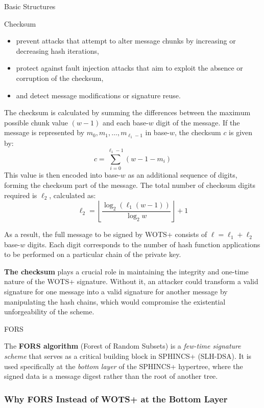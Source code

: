 \documentclass[version=preprint]{iacrcc}
\begin{document}
\begin{section}{Basic Structures}{\label{sec1}}
\begin{subsection}{Checksum}{\label{sec:Checksum}}
\begin{itemize}
    \item prevent attacks that attempt to alter message chunks by increasing or decreasing hash iterations,
    \item protect against fault injection attacks that aim to exploit the absence or corruption of the checksum,
    \item and detect message modifications or signature reuse.
\end{itemize}

The checksum is calculated by summing the differences between the maximum possible chunk value $(w-1)$ and each base-$w$ digit of the message. If the message is represented by $m_0, m_1, \ldots, m_{\ell_1-1}$ in base-$w$, the checksum $c$ is given by:
\[
c = \sum_{i=0}^{\ell_1-1} (w - 1 - m_i)
\]
This value is then encoded into base-$w$ as an additional sequence of digits, forming the checksum part of the message. The total number of checksum digits required is $\ell_2$, calculated as:
\[
\ell_2 = \left\lfloor \frac{\log_2(\ell_1(w-1))}{\log_2 w} \right\rfloor + 1
\]

As a result, the full message to be signed by WOTS+ consists of $\ell = \ell_1 + \ell_2$ base-$w$ digits. Each digit corresponds to the number of hash function applications to be performed on a particular chain of the private key.

\textbf{The checksum} plays a crucial role in maintaining the integrity and one-time nature of the WOTS+ signature. Without it, an attacker could transform a valid signature for one message into a valid signature for another message by manipulating the hash chains, which would compromise the existential unforgeability of the scheme.

\end{subsection}


\begin{subsection}{FORS}

    The \textbf{FORS algorithm} (Forest of Random Subsets) \cite{bernstein2019sphincs+} is a \textit{few-time signature scheme} that serves as a critical building block in SPHINCS+ (SLH-DSA). It is used specifically at the \emph{bottom layer} of the SPHINCS+ hypertree, where the signed data is a message digest rather than the root of another tree.

    \subsubsection{Why FORS Instead of WOTS+ at the Bottom Layer}


\end{subsection}
\end{section}
\end{document}
